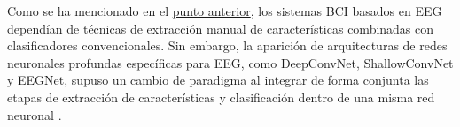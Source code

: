 Como se ha mencionado en el \hyperref[sec:metodos_tradicionales]{punto anterior}, los sistemas BCI basados en EEG dependían de técnicas de extracción manual de características combinadas con clasificadores convencionales. Sin embargo, la aparición de arquitecturas de redes neuronales profundas específicas para EEG, como DeepConvNet, ShallowConvNet y EEGNet, supuso un cambio de paradigma al integrar de forma conjunta las etapas de extracción de características y clasificación dentro de una misma red neuronal \cite{schirrmeister_DeepLearning2017,kollod_DeepComparisons2023,lawhern_EEGNetCompact2018}.
